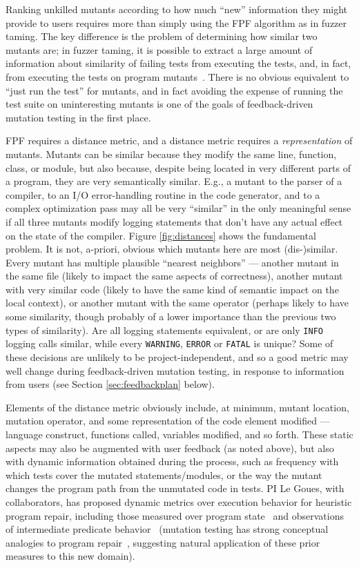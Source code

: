 Ranking unkilled mutants according to how much ``new'' information they might
provide to users requires more than simply using the FPF algorithm as
in fuzzer taming.  The key difference is the problem of determining
how similar two mutants are; in fuzzer taming, it is possible to
extract a large amount of information about similarity of failing
tests from executing the tests, and, in fact, from executing the tests
on program mutants~\cite{PLDI13,distMut}.  There is no obvious
equivalent to
``just run the test'' for mutants, and in fact avoiding the expense of running
the test suite on uninteresting mutants is one of the goals of
feedback-driven mutation testing in the first place.

FPF requires a distance metric, and a distance metric requires a
\emph{representation} of mutants.  Mutants can be similar because they
modify the same line, function, class, or module, but also because,
despite being located in very different parts of a program, they are
very semantically similar.  E.g., a mutant to the parser of a compiler, to
an I/O error-handling routine in the code generator, and to a complex
optimization pass may all be very ``similar'' in the only meaningful
sense if all three mutants modify logging statements that don't have
any actual effect on the state of the compiler.  Figure
\ref{fig:distances} shows the fundamental problem.  It is not,
a-priori, obvious which mutants here are most (dis-)similar.  Every
mutant has multiple plausible ``nearest neighbors'' --- another mutant
in the same file (likely to impact the same aspects of correctness),
another mutant with very similar code (likely to have the same kind of
semantic impact on the local context), or another mutant with the same operator (perhaps
likely to have some similarity, though probably of a lower importance
than the previous two types of similarity).  Are all logging statements
equivalent, or are only {\tt INFO} logging calls similar, while every
{\tt WARNING}, {\tt ERROR} or {\tt FATAL} is unique?  Some of these
decisions are unlikely to be project-independent, and so a good metric
may well change during feedback-driven mutation testing, in response
to information from users (see Section \ref{sec:feedbackplan} below).

Elements of the
distance metric obviously include, at minimum, mutant location, mutation operator, and
some representation of the code element modified --- language
construct, functions called, variables modified, and so forth.  These
static aspects may also be augmented with user feedback (as noted
above), but also with dynamic information obtained during the process,
such as frequency with which tests cover the mutated
statements/modules, or the way the mutant changes the
program path from the unmutated code in tests.  PI Le Goues, with collaborators,
has proposed dynamic metrics over execution behavior for heuristic program repair,
including those measured over program state~\cite{desouza-gecco18,oliveira-ese18} and
observations of intermediate predicate behavior~\cite{Ding2019} (mutation testing
has strong conceptual analogies to program repair~\cite{Weimer2013}, suggesting
natural application of these prior measures to this new domain). 

